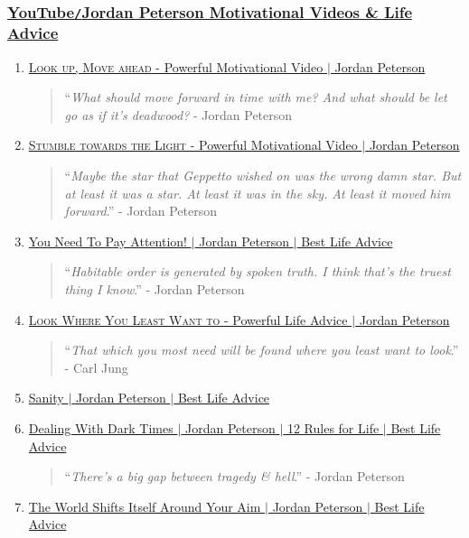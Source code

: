 \documentclass{article}
\begin{document}
\subsubsection{\href{https://www.youtube.com/playlist?list=PLi3n6z1voQ1arCpQ89izFMwk7lsFrFnq0}{YouTube{\tt/}Jordan Peterson Motivational Videos \& Life Advice}}
\begin{enumerate}
	\item \href{https://www.youtube.com/watch?v=MUmKnW1j2Xs}{\textsc{Look up, Move ahead} - Powerful Motivational Video $|$ Jordan Peterson}
	\begin{quotation}
		``{\it What should move forward in time with me? And what should be let go as if it's deadwood?} - Jordan Peterson
	\end{quotation}
	\item \href{https://www.youtube.com/watch?v=PrIrZRd0pGE}{\textsc{Stumble towards the Light} - Powerful Motivational Video $|$ Jordan Peterson}
	\begin{quotation}
		``{\it Maybe the star that Geppetto wished on was the wrong damn star. But at least it was a star. At least it was in the sky. At least it moved him forward}.'' - Jordan Peterson
	\end{quotation}
	\item \href{https://www.youtube.com/watch?v=L0FCwYKkZ4o}{You Need To Pay Attention! $|$ Jordan Peterson $|$ Best Life Advice}
	\begin{quotation}
		``{\it Habitable order is generated by spoken truth. I think that's the truest thing I know}.'' - Jordan Peterson
	\end{quotation}
	\item \href{https://www.youtube.com/watch?v=LjIAzKo62MQ}{\textsc{Look Where You Least Want to} - Powerful Life Advice $|$ Jordan Peterson}
	\begin{quotation}
		``{\it That which you most need will be found where you least want to look}.'' - Carl Jung
	\end{quotation}
	\item \href{https://www.youtube.com/watch?v=_g6Aqrl3fFM}{Sanity $|$ Jordan Peterson $|$ Best Life Advice}
	\item \href{https://www.youtube.com/watch?v=3EGIlQyEwvE}{Dealing With Dark Times $|$ Jordan Peterson $|$ 12 Rules for Life $|$ Best Life Advice}
	\begin{quotation}
		``{\it There's a big gap between tragedy \& hell}.'' - Jordan Peterson
	\end{quotation}
	\item \href{https://www.youtube.com/watch?v=zRYjVFFsi38}{The World Shifts Itself Around Your Aim $|$ Jordan Peterson $|$ Best Life Advice}

\end{enumerate}
\end{document}
